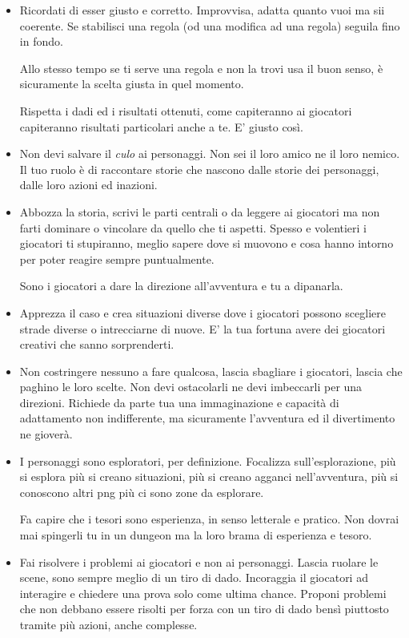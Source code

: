 \begin{multicols}{2}
\begin{itemize}[leftmargin=*]
\item
Ricordati di esser giusto e corretto. Improvvisa, adatta quanto vuoi ma sii coerente. Se stabilisci una regola (od una modifica ad una regola) seguila fino in fondo.

Allo stesso tempo se ti serve una regola e non la trovi usa il buon senso, è sicuramente la scelta giusta in quel momento.

Rispetta i dadi ed i risultati ottenuti, come capiteranno ai giocatori capiteranno risultati particolari anche a te. E' giusto così.

\item
Non devi salvare il \emph{culo} ai personaggi. Non sei il loro amico ne il loro nemico. Il tuo ruolo è di raccontare storie che nascono dalle storie dei personaggi, dalle loro azioni ed inazioni.

\item
Abbozza la storia, scrivi le parti centrali o da leggere ai giocatori ma non farti dominare o vincolare da quello che ti aspetti. Spesso e volentieri i giocatori ti stupiranno, meglio sapere dove si muovono e cosa hanno intorno per poter reagire sempre puntualmente.

Sono i giocatori a dare la direzione all'avventura e tu a dipanarla.

\item
Apprezza il caso e crea situazioni diverse dove i giocatori possono scegliere strade diverse o intrecciarne di nuove. E' la tua fortuna avere dei giocatori creativi che sanno sorprenderti.

\item
Non costringere nessuno a fare qualcosa, lascia sbagliare i giocatori, lascia che paghino le loro scelte. Non devi ostacolarli ne devi imbeccarli per una direzioni. Richiede da parte tua una immaginazione e capacità di adattamento non indifferente, ma sicuramente l'avventura ed il divertimento ne gioverà.

\item
I personaggi sono esploratori, per definizione. Focalizza sull'esplorazione, più si esplora più si creano situazioni, più si creano agganci nell'avventura, più si conoscono altri png più ci sono zone da esplorare.

Fa capire che i tesori sono esperienza, in senso letterale e pratico. Non dovrai mai spingerli tu in un dungeon ma la loro brama di esperienza e tesoro.

\item
Fai risolvere i problemi ai giocatori e non ai personaggi. Lascia ruolare le scene, sono sempre meglio di un tiro di dado. Incoraggia il giocatori ad interagire e chiedere una prova solo come ultima chance. Proponi problemi che non debbano essere risolti per forza con un tiro di dado bensì piuttosto tramite più azioni, anche complesse.


\end{itemize}
\end{multicols}
